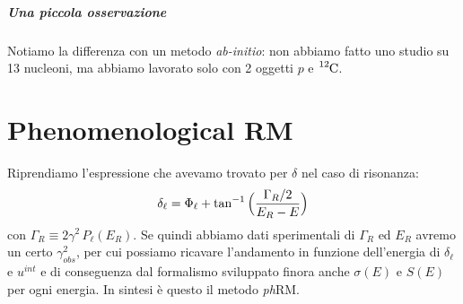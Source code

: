 \subparagraph{Una piccola osservazione} Notiamo la differenza con un metodo \textit{ab-initio}: non abbiamo fatto uno studio su 13 nucleoni, ma abbiamo lavorato solo con 2 oggetti $p$ e $\ce{^{12}C}$.

\newpage

\section{Phenomenological RM}
Riprendiamo l'espressione che avevamo trovato per $\delta$ nel caso di risonanza:
$$\delta_\ell = \Phi_\ell + \tan^{-1} {\Bigl ( \frac{\Gamma_R /2}{E_R-E} \Bigr )}$$
con $\Gamma_R\equiv 2\gamma^2 \, P_\ell(E_R)$. Se quindi abbiamo dati sperimentali di $\Gamma_R$ ed $E_R$ avremo un certo $\gamma^2_{obs}$, per cui possiamo ricavare l'andamento in funzione dell'energia di $\delta_\ell$ e $u^{int}$ e di conseguenza dal formalismo sviluppato finora anche $\sigma(E)$ e $S(E)$ per ogni energia. In sintesi è questo il metodo \textit{ph}RM.

